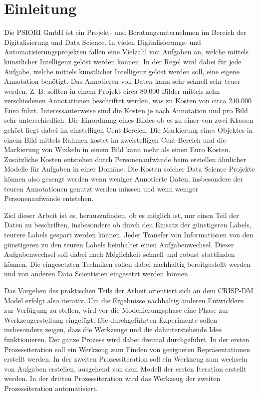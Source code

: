 \listoftodos

\chapter{Einleitung}
\label{chap:Einleitung}
	Die PSIORI GmbH \cite{PSIORIGmbH.2020} ist ein Projekt- und Beratungsunternehmen im Bereich der Digitalisierung und Data Science. In vielen Digitalisierungs- und Automatisierungsprojekten fallen eine Vielzahl von Aufgaben an, welche mittels künstlicher Intelligenz gelöst werden können. In der Regel wird dabei für jede Aufgabe, welche mittels künstlicher Intelligenz gelöst werden soll, eine eigene Annotation benötigt. Das Annotieren von Daten kann sehr schnell sehr teuer werden. Z. B. sollten in einem Projekt circa 80.000 Bilder mittels zehn verschiedenen Annotationen beschriftet werden, was zu Kosten von circa 240.000 Euro führt. Interessanterweise sind die Kosten je nach Annotation und pro Bild sehr unterschiedlich. Die Einordnung eines Bildes ob es zu einer von zwei Klassen gehört liegt dabei im einstelligen Cent-Bereich. Die Markierung eines Objektes in einem Bild mittels Rahmen kostet im zweistelligen Cent-Bereich und die Markierung von Winkeln in einem Bild kann mehr als einen Euro Kosten. Zusätzliche Kosten entstehen durch Personenaufwände beim erstellen ähnlicher Modelle für Aufgaben in einer Domäne. Die Kosten solcher Data Science Projekte können also gesengt werden wenn weniger Annotierte Daten, insbesondere der teuren Annotationen genutzt werden müssen und wenn weniger Personenaufwände entstehen.
	
	Ziel dieser Arbeit ist es, herauszufinden, ob es möglich ist, nur einen Teil der Daten zu beschriften, insbesondere ob durch den Einsatz der günstigeren Labels, teurere Labels gespart werden können. Jeder Transfer von Informationen von den günstigeren zu den teuren Labels beinhaltet einen Aufgabenwechsel. Dieser Aufgabenwechsel soll dabei nach Möglichkeit schnell und robust stattfinden können. Die eingesetzten Techniken sollen dabei nachhaltig bereitgestellt werden und von anderen Data Scientisten eingesetzt werden können. 
	
	Das Vorgehen des praktischen Teils der Arbeit orientiert sich an dem CRISP-DM Model \cite{Shearer.2000} erfolgt also iterativ. Um die Ergebnisse nachhaltig anderen Entwicklern zur Verfügung zu stellen, wird vor die Modellierungsphase eine Phase zur Werkzeugerstellung eingefügt. Die durchgeführten Experimente sollen insbesondere zeigen, dass die Werkzeuge und die dahinterstehende Idee funktionieren. Der ganze Prozess wird dabei dreimal durchgeführt. In der ersten Prozessiteration soll ein Werkzeug zum Finden von geeigneten Repräsentationen erstellt werden. In der zweiten Prozessiteration soll ein Werkzeug zum wechseln von Aufgaben erstellen, ausgehend von dem Modell der ersten Iteration erstellt werden. In der dritten Prozessiteration wird das Werkzeug der zweiten Prozessiteration automatisiert.
	
